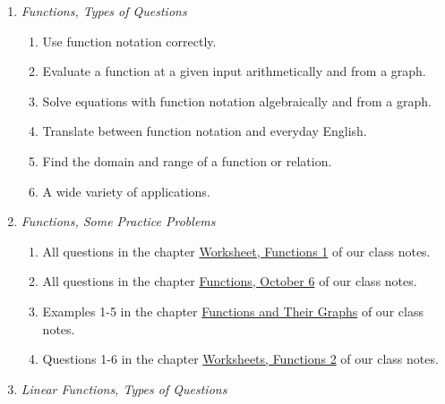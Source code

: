 \documentclass{ximera}
\begin{document}
\begin{enumerate}
\begin{enumerate}
\item Practice: Exercises 1-7 at the end of this chapter and many of the problems below about functions.
\end{enumerate}

\item \emph{Functions, Types of Questions}

\begin{enumerate}
\item Use function notation correctly.

\item Evaluate a function at a given input arithmetically and from a graph.

\item Solve equations with function notation algebraically and from a graph.

\item Translate between function notation and everyday English.

\item Find the domain and range of a function or relation.

\item A wide variety of applications.
\end{enumerate}

\item \emph{Functions, Some Practice Problems}

\begin{enumerate}
\item All questions in the chapter \href{https://ximera.osu.edu/precalc1/PreCalculus1/WSFunctions1/WSFunctions1}{Worksheet, Functions 1} of our class notes.

\item  All questions in the chapter \href{https://ximera.osu.edu/precalc1/PreCalculus1/Functions106/Functions106}{Functions, October 6} of our class notes.

\item Examples 1-5 in the chapter \href{https://ximera.osu.edu/precalc1/PreCalculus1/Functions2/Functions2}{Functions and Their Graphs} of our class notes.

\item Questions 1-6 in the chapter \href{https://ximera.osu.edu/precalc1/PreCalculus1/WSFunctions2/WSFunctions2}{Worksheets, Functions 2} of our class notes.
\end{enumerate}

\item \emph{Linear Functions, Types of Questions}


\end{enumerate}
\end{document}
